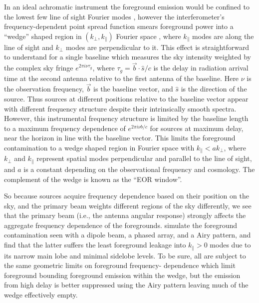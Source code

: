 In an ideal achromatic instrument the foreground emission would be confined to the lowest few 
line of sight Fourier modes \citep[e.g.,][]{MoralesBowmanHewittFGsub}, however  the  
interferometer's frequency-dependent point spread function smears foreground power into a ``wedge'' shaped 
region in $(k_\perp,k_\parallel)$ Fourier space \citep{Dattapowerspec,X13, pober13,MoralesPSShapes, VedanthamWedge, nithya13, CathWedge, AdrianWedge1, AdrianWedge2,parsons12b}, where $k_\parallel$ modes are along the line of sight and $k_\perp$ modes are perpendicular to it. This effect is straightforward to understand for a single baseline which measures the sky intensity weighted by the complex sky fringe 
$e^{2\pi i \nu \tau_g}$, where $\tau_g=\vec{b}\cdot\hat{s}/c$ is the delay in radiation arrival time at the second antenna relative to the first antenna of the baseline. Here $\nu$ is the observation frequency, $\vec{b}$ is the baseline vector, and $\hat{s}$ is the direction of the source. 
 Thus sources at different positions relative to the baseline vector appear with different 
frequency structure despite their intrinsically smooth spectra. However, this instrumental frequency structure is limited 
by the baseline length to a maximum frequency dependence of  $e^{2\pi i \nu b/c}$ for sources at maximum delay, near the horizon in line with the baseline vector. This limits the foreground contamination 
to a wedge shaped region in Fourier space with $k_\parallel<a k_\perp$, where $k_\perp$ and $k_\parallel$ represent spatial modes 
perpendicular and parallel to the line of sight, and $a$ is a constant depending on the observational frequency and cosmology. The complement of the wedge is known as the ``EOR window''.

So because sources acquire frequency dependence based on their position on the sky, and the primary beam weights different regions of the sky differently, we see that the primary beam (i.e., the antenna angular response) strongly affects the aggregate frequency dependence 
of the foregrounds. \citet{nithya15} simulate the foreground contamination seen with a dipole beam, a phased array, and a Airy pattern,
and find that the latter suffers the least foreground leakage into
 $k_\parallel>0$ modes due to its narrow main lobe and minimal sidelobe 
levels. To be sure, all are subject to the same geometric limits on foreground frequency-
dependence which limit foreground bounding foreground emission within the wedge, but the emission from high delay is better suppressed using the 
Airy pattern leaving much of the wedge effectively empty. 

